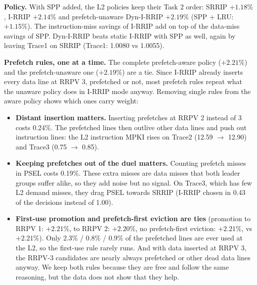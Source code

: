 \textbf{Policy.} With SPP added, the L2 policies keep their Task 2 order: SRRIP $+1.18\%$, I-RRIP $+2.14\%$ and
prefetch-unaware Dyn-I-RRIP $+2.19\%$ (SPP + LRU: $+1.15\%$). The instruction-miss savings of I-RRIP add on top of the
data-miss savings of SPP. Dyn-I-RRIP beats static I-RRIP with SPP as well, again by leaving Trace1 on SRRIP
(Trace1: 1.0080 vs 1.0055).

\textbf{Prefetch rules, one at a time.} The complete prefetch-aware policy ($+2.21\%$) and the prefetch-unaware one
($+2.19\%$) are a tie. Since I-RRIP already inserts every data line at RRPV 3, prefetched or not, most prefetch rules
repeat what the unaware policy does in I-RRIP mode anyway. Removing single rules from the aware policy shows which
ones carry weight:
\begin{itemize}
  \item \textbf{Distant insertion matters.} Inserting prefetches at RRPV 2 instead of 3 costs 0.24\%. The prefetched
        lines then outlive other data lines and push out instruction lines: the L2 instruction MPKI rises on Trace2
        (12.59 $\to$ 12.90) and Trace3 (0.75 $\to$ 0.85).
  \item \textbf{Keeping prefetches out of the duel matters.} Counting prefetch misses in PSEL costs 0.19\%. These
        extra misses are data misses that both leader groups suffer alike, so they add noise but no signal. On Trace3,
        which has few L2 demand misses, they drag PSEL towards SRRIP (I-RRIP chosen in 0.43 of the decisions instead of 1.00).
  \item \textbf{First-use promotion and prefetch-first eviction are ties} (promotion to RRPV 1: $+2.21\%$, to RRPV 2:
        $+2.20\%$, no prefetch-first eviction: $+2.21\%$, vs $+2.21\%$). Only 2.3\% / 0.8\% / 0.9\% of the
        prefetched lines are ever used at the L2, so the first-use rule rarely runs. And with data inserted at RRPV 3,
        the RRPV-3 candidates are nearly always prefetched or other dead data lines anyway. We keep both rules because
        they are free and follow the same reasoning, but the data does not show that they help.
\end{itemize}


